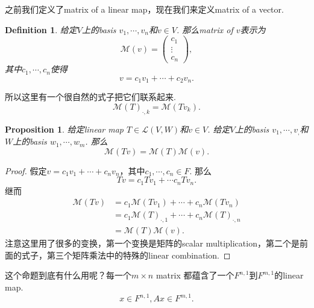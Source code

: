 \documentclass{article}
\newtheorem{proposition}[theorem]{Proposition}
\newtheorem{definition}[theorem]{Definition}
\begin{document}
之前我们定义了matrix of a linear map，现在我们来定义matrix of a vector.

\begin{definition}
给定$V$上的basis $v_1,\cdots,v_n$和$v \in V$. 那么matrix of $v$表示为
$$
\mathcal{M}(v)=
\begin{pmatrix}
c_1 \\
\vdots\\
c_n
\end{pmatrix},
$$ 
其中$c_1,\cdots,c_n$使得
$$
v = c_1v_1 + \cdots + c_2v_n.
$$
\end{definition} 

{\color{red} 所以这里有一个很自然的式子把它们联系起来}.
$$
\mathcal{M}(T)_{\cdot,k}=\mathcal{M}(Tv_k).
$$

\begin{proposition}
\rm 给定linear map $T \in \mathcal{L}(V,W)$和$v \in V$. 给定$V$上的basis $v_1,\cdots,v_,$和$W$上的basis $w_1,\cdots,w_m$. 那么
$$
\mathcal{M}(Tv) =  \mathcal{M}(T)\mathcal{M}(v).
$$
\end{proposition}

\begin{proof}
假定$v=c_1v_1 + \cdots + c_nv_n$，其中$c_1,\cdots,c_n \in F$. 那么
$$
Tv =  c_1Tv_1 + \cdots c_nTv_n.
$$
继而
$$
\begin{aligned}
\mathcal{M}(Tv) &= c_1\mathcal{M}(Tv_1) + \cdots +c_n \mathcal{M}(Tv_n) \\
				&= c_1\mathcal{M}(T)_{\cdot,1} + \cdots + c_n \mathcal{M}(T)_{\cdot,n} \\
				&= \mathcal{M}(T)\mathcal{M}(v).
\end{aligned} 
$$
注意这里用了很多的变换，第一个变换是矩阵的scalar multiplication，第二个是前面的式子，第三个矩阵乘法中的特殊的linear combination.
\end{proof}

这个命题到底有什么用呢？{\color{blue}每一个$m \times n$ matrix 都蕴含了一个$F^{n,1}$到$F^{m,1}$的linear map}.
$$
x \in F^{n,1} , Ax \in F^{m,1}.
$$
\end{document}
